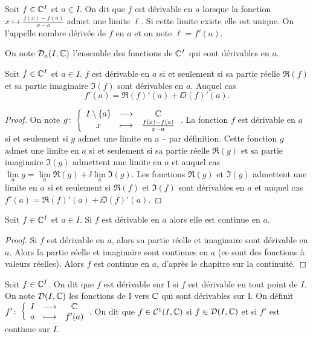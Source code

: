 \begin{defdef}
  Soit \(f \in \mathbb{C}^I\) et \(a \in I\). On dit que \(f\) est dérivable en \(a\) 
  lorsque la fonction \(x \longmapsto \frac{f(x)-f(a)}{x-a}\) admet une limite 
  \(\ell\). Si cette limite existe elle est unique. On l'appelle nombre dérivée 
  de \(f\) en \(a\) et on note \(\ell=f'(a)\).

  On note \(\mathcal{D}_{a}(I,\mathbb{C})\) l'ensemble des fonctions de \(\mathbb{C}^I\) qui sont 
  dérivables en \(a\).
\end{defdef}
\begin{theo}
  Soit \(f \in \mathbb{C}^I\) et \(a \in I\). \(f\) est dérivable en \(a\) si et 
  seulement si sa partie réelle \(\Re(f)\) et sa partie imaginaire \(\Im(f)\) 
  sont dérivables en \(a\). Auquel cas
  \begin{equation}
    f'(a) = \Re(f)'(a) + \ii \Im(f)'(a).
  \end{equation}
\end{theo}
\begin{proof}
  On note \(g\colon\left\{\begin{array}{ccc}I\setminus\{a\} & \longrightarrow &\mathbb{C}\\x & \longmapsto & \frac{f(x)-f(a)}{x-a}\end{array}\right.\). La 
  fonction \(f\) est dérivable en \(a\) si et seulement si \(g\) admet une 
  limite en a -- par définition. Cette fonction \(g\) admet une limite en \(a\) 
  si et seulement si sa partie réelle \(\Re(g)\) et sa partie imaginaire 
  \(\Im(g)\) admettent une limite en \(a\) et auquel cas \(\lim\limits_{a}g =  
  \lim\limits_{a} \Re(g) + \ii \lim\limits_{a} \Im(g)\). Les fonctions 
  \(\Re(g)\) et \(\Im(g)\) admettent une limite en \(a\) si et seulement si  
  \(\Re(f)\) et \(\Im(f)\) sont dérivables en \(a\) et auquel cas \(f'(a) = 
  \Re(f)'(a) + \ii \Im(f)'(a)\).
\end{proof}
\begin{prop}
  Soit \(f \in \mathbb{C}^I\) et \(a \in I\). Si \(f\) est dérivable en \(a\) alors elle 
  est continue en \(a\).
\end{prop}
\begin{proof}
  Si \(f\) est dérivable en \(a\), alors sa partie réelle et imaginaire sont 
  dérivable en \(a\). Alors la partie réelle et imaginaire sont continues en 
  \(a\) (ce sont des fonctions à valeurs réelles). Alors \(f\) est continue en 
  \(a\), d'après le chapitre sur la continuité.
\end{proof}
\begin{defdef}
  Soit \(f \in \mathbb{C}^I\). On dit que \(f\) est dérivable sur I si \(f\) est 
  dérivable en tout point de \(I\). On note \(\mathcal{D}(I,\mathbb{C})\) les fonctions de I 
  vers \(\mathbb{C}\) qui sont dérivables sur I. On définit 
  \(f'\colon\left\{\begin{array}{ccc}I & \longrightarrow &\mathbb{C}\\a & \longmapsto & f'(a)\end{array}\right.\). On dit que \(f \in \mathcal{C}^{1}(I,\mathbb{C})\) si 
  \(f \in \mathcal{D}(I,\mathbb{C})\) et si \(f'\) est continue sur \(I\).
\end{defdef}


